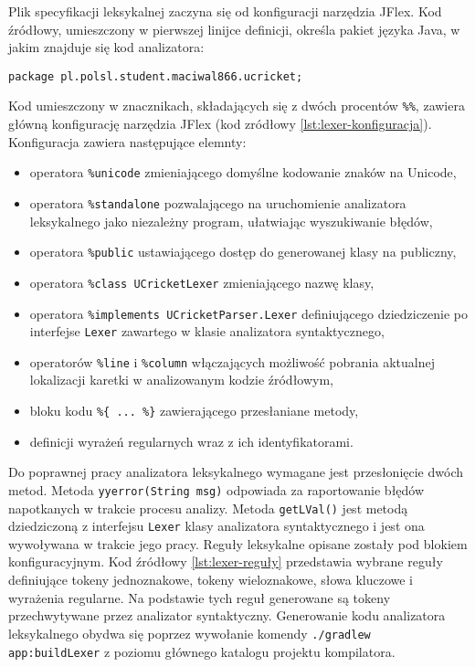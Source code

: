 Plik specyfikacji leksykalnej zaczyna się od konfiguracji narzędzia JFlex. Kod źródłowy, umieszczony w pierwszej linijce definicji, określa pakiet języka Java, w jakim znajduje się kod analizatora:
\begin{lstlisting}
package pl.polsl.student.maciwal866.ucricket;
\end{lstlisting}
Kod umieszczony w znacznikach, składających się z dwóch procentów \lstinline|%%|, zawiera główną konfigurację narzędzia JFlex (kod zródłowy \ref{lst:lexer-konfiguracja}). Konfiguracja zawiera następujące elemnty:
\begin{itemize}
\item operatora \lstinline|%unicode| zmieniającego domyślne kodowanie znaków na Unicode,
\item operatora \lstinline|%standalone| pozwalającego na uruchomienie analizatora leksykalnego jako niezależny program, ułatwiając wyszukiwanie błędów,
\item operatora \lstinline|%public| ustawiającego dostęp do generowanej klasy na publiczny,
\item operatora \lstinline|%class UCricketLexer| zmieniającego nazwę klasy,
\item operatora \lstinline|%implements UCricketParser.Lexer| definiującego dziedziczenie po interfejse \lstinline|Lexer| zawartego w klasie analizatora syntaktycznego,
\item operatorów \lstinline|%line| i \lstinline|%column| włączających możliwość pobrania aktualnej lokalizacji karetki w analizowanym kodzie źródłowym,
\item bloku kodu \lstinline|%{ ... %}| zawierającego przesłaniane metody,
\item definicji wyrażeń regularnych wraz z ich identyfikatorami.
\end{itemize}
Do poprawnej pracy analizatora leksykalnego wymagane jest przesłonięcie dwóch metod. Metoda \lstinline|yyerror(String msg)| odpowiada za raportowanie błędów napotkanych w trakcie procesu analizy. Metoda \lstinline|getLVal()| jest metodą dziedziczoną z interfejsu \lstinline|Lexer| klasy analizatora syntaktycznego i jest ona wywoływana w trakcie jego pracy.
Reguły leksykalne opisane zostały pod blokiem konfiguracyjnym. Kod źródłowy \ref{lst:lexer-reguły} przedstawia wybrane reguły definiujące tokeny jednoznakowe, tokeny wieloznakowe, słowa kluczowe i wyrażenia regularne. Na podstawie tych reguł generowane są tokeny przechwytywane przez analizator syntaktyczny.
Generowanie kodu analizatora leksykalnego obydwa się poprzez wywołanie komendy \lstinline|./gradlew app:buildLexer| z poziomu głównego katalogu projektu kompilatora.

